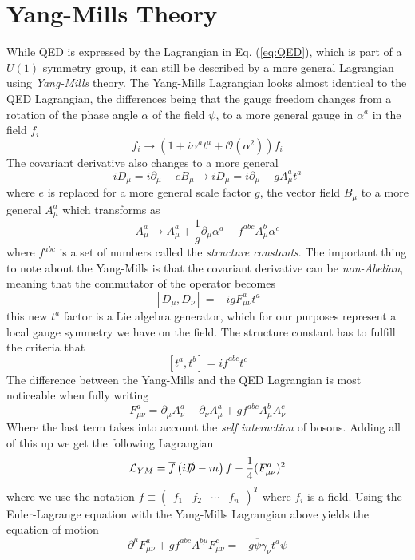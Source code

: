 \documentclass[12pt, a4paper]{book}
\begin{document}
\section{Yang-Mills Theory}
While QED is expressed by the Lagrangian in Eq. (\ref{eq:QED}), which is part of a $U(1)$ symmetry group, it can still be described by a more general Lagrangian using \textit{Yang-Mills} theory.
The Yang-Mills Lagrangian looks almost identical to the QED Lagrangian, the differences being that the gauge freedom changes from a rotation of the phase angle $\alpha$ of the field $\psi$, to a more general
gauge in $\alpha^a$ in the field $f_i$ 
$$
    f_i \rightarrow \left(1+i \alpha^a t^a + \mathcal{O}(\alpha^2)\right) f_i    
$$
The covariant derivative also changes to a more general 
$$
iD_\mu = i\partial_\mu -eB_\mu\rightarrow iD_\mu = i\partial_\mu -gA^a_\mu t^a
$$
where $e$ is replaced for a more general scale factor $g$, the vector field $B_\mu$ to a more general $A_\mu^a$ which transforms as 
$$
A_\mu^a \rightarrow A^a_\mu +\frac{1}{g}\partial_\mu\alpha^a +f^{abc}A_\mu^b\alpha^c
$$
where $f^{abc}$ is a set of numbers called the \textit{structure constants}. 
The important thing to note about the Yang-Mills is that the covariant derivative can be \textit{non-Abelian}, meaning that the commutator of the operator becomes
$$
\left[D_\mu,D_\nu\right] = -igF_{\mu\nu}^at^a
$$
this new $t^a$ factor is a Lie algebra generator, which for our purposes represent a local gauge symmetry we have on the field. The structure constant has to fulfill the criteria that
\begin{equation}\label{eq:struc_const}
    [t^a,t^b]=if^{abc}t^c
\end{equation}
The difference between the Yang-Mills and the QED Lagrangian is most noticeable when fully writing
$$
F_{\mu\nu}^a = \partial_\mu A_\nu^a -\partial_\nu A_\mu^a +gf^{abc}A_\mu^b A_\nu^c
$$
Where the last term takes into account the \textit{self interaction} of bosons. Adding all of this up we get the following Lagrangian
\begin{equation}\label{eq:YM_lag}
    \mathcal{L}_{YM} = \overline{f}\left(i\slashed{D} -m\right)f -\frac{1}{4}(F^a_{\mu\nu})^2
\end{equation}
where we use the notation $f\equiv\begin{pmatrix}f_1&f_2&\cdots&f_n\end{pmatrix}^T$ where $f_i$ is a field. 
Using the Euler-Lagrange equation with the Yang-Mills Lagrangian above yields the equation of motion
\begin{equation}\label{eq:YM_eq}
    \partial^\mu F^a_{\mu\nu} +gf^{abc}A^{b\mu}F^c_{\mu\nu} = -g\overline{\psi}\gamma_\nu t^a\psi
\end{equation}
\end{document}
